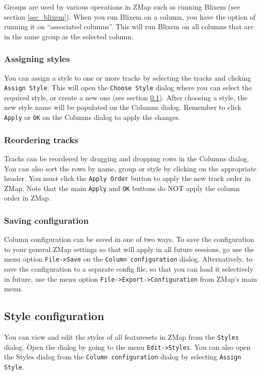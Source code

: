 \documentclass[letterpaper]{article}
\begin{document}
Groups are used by various operations in ZMap such as running Blixem (see section \ref{sec_blixem}). When you run Blixem on a column, you have the option of running it on ``associated columns''. This will run Blixem on all columns that are in the same group as the selected column.

\subsubsection{Assigning styles}
You can assign a style to one or more tracks by selecting the tracks and clicking \lstinline{Assign Style}. This will open the \lstinline{Choose Style} dialog where you can select the required style, or create a new one (see section \ref{sec_style_configuration}). After choosing a style, the new style name will be populated on the Columns dialog. Remember to click \lstinline{Apply} or \lstinline{OK} on the Columns dialog to apply the changes.

\subsubsection{Reordering tracks}
Tracks can be reordered by dragging and dropping rows in the Columns dialog. You can also sort the rows by name, group or style by clicking on the appropriate header. You must click the \lstinline{Apply Order} button to apply the new track order in ZMap. Note that the main \lstinline{Apply} and \lstinline{OK} buttons do NOT apply the column order in ZMap.

\subsubsection{Saving configuration}
Column configuration can be saved in one of two ways. To save the configuration to your general ZMap settings so that will apply in all future sessions, go use the menu option \lstinline{File->Save} on the \lstinline{Column configuration} dialog. Alternatively, to save the configuration to a separate config file, so that you can load it selectively in future, use the menu option \lstinline{File->Export->Configuration} from ZMap's main menu.


\subsection{Style configuration} \label{sec_style_configuration}
You can view and edit the styles of all featuresets in ZMap from the \lstinline{Styles} dialog. Open the dialog by going to the menu \lstinline{Edit->Styles}. You can also open the Styles dialog from the \lstinline{Column configuration} dialog by selecting \lstinline{Assign Style}.
\end{document}
